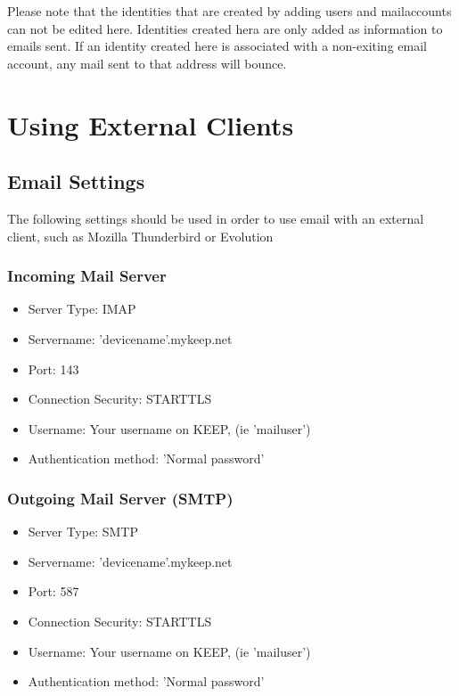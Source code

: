 \documentclass[12pt,a4paper,titlepage]{article}
\begin{document}
Please note that the identities that are created by adding users and mailaccounts can not be edited here. Identities created hera are only added as information to emails sent. If an identity created here is associated with a non-exiting email account, any mail sent to that address will bounce.

\newpage
\section{Using External Clients}
\subsection{Email Settings}
The following settings should be used in order to use email with an external client, such as Mozilla Thunderbird or Evolution

\subsubsection{Incoming Mail Server}
\begin{itemize}
\item Server Type: IMAP
\item Servername: 'devicename'.mykeep.net
\item Port: 143
\item Connection Security: STARTTLS
\item Username: Your username on KEEP, (ie 'mailuser')
\item Authentication method: 'Normal password'
\end{itemize}

\subsubsection{Outgoing Mail Server (SMTP)}
\begin{itemize}
\item Server Type: SMTP
\item Servername: 'devicename'.mykeep.net
\item Port: 587
\item Connection Security: STARTTLS
\item Username: Your username on KEEP, (ie 'mailuser')
\item Authentication method: 'Normal password'
\end{itemize}

\newpage
\end{document}
